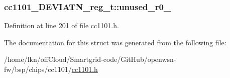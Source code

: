 \subsubsection[{\texorpdfstring{unused\+\_\+r0\+\_\+2}{unused_r0_2}}]{ cc1101\+\_\+\+D\+E\+V\+I\+A\+T\+N\+\_\+reg\+\_\+t\+::unused\+\_\+r0\+\_}\hypertarget{structcc1101___d_e_v_i_a_t_n__reg__t_a89dc7e642f1bcc5fe8ff33f5c18333b0}{}\label{structcc1101___d_e_v_i_a_t_n__reg__t_a89dc7e642f1bcc5fe8ff33f5c18333b0}


Definition at line 201 of file cc1101.\+h.



The documentation for this struct was generated from the following file\+:\begin{DoxyCompactItemize}
\item 
/home/lkn/off\+Cloud/\+Smartgrid-\/code/\+Git\+Hub/openwsn-\/fw/bsp/chips/cc1101/\hyperlink{cc1101_8h}{cc1101.\+h}\end{DoxyCompactItemize}
